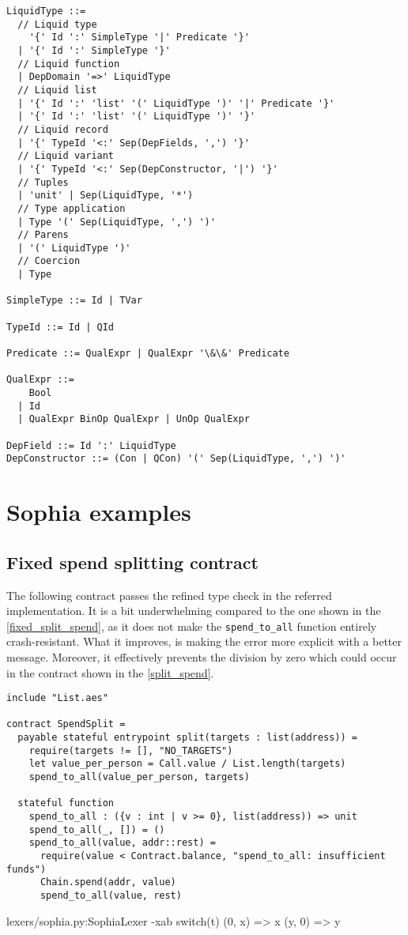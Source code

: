 \begin{lstlisting}[language=bnf]
LiquidType ::=
  // Liquid type
    '{' Id ':' SimpleType '|' Predicate '}'
  | '{' Id ':' SimpleType '}'
  // Liquid function
  | DepDomain '=>' LiquidType
  // Liquid list
  | '{' Id ':' 'list' '(' LiquidType ')' '|' Predicate '}'
  | '{' Id ':' 'list' '(' LiquidType ')' '}'
  // Liquid record
  | '{' TypeId '<:' Sep(DepFields, ',') '}'
  // Liquid variant
  | '{' TypeId '<:' Sep(DepConstructor, '|') '}'
  // Tuples
  | 'unit' | Sep(LiquidType, '*')
  // Type application
  | Type '(' Sep(LiquidType, ',') ')'
  // Parens
  | '(' LiquidType ')'
  // Coercion
  | Type

SimpleType ::= Id | TVar

TypeId ::= Id | QId

Predicate ::= QualExpr | QualExpr '\&\&' Predicate

QualExpr ::=
    Bool
  | Id
  | QualExpr BinOp QualExpr | UnOp QualExpr

DepField ::= Id ':' LiquidType
DepConstructor ::= (Con | QCon) '(' Sep(LiquidType, ',') ')'
\end{lstlisting}

\chapter{Sophia examples}

\section{Fixed spend splitting contract}
\label{fixed_spend_split}

The following contract passes the refined type check in the referred
implementation. It is a bit underwhelming compared to the one shown in the
\autoref{fixed_split_spend}, as it does not make the \texttt{spend\_to\_all}
function entirely crash-resistant. What it improves, is making the error more
explicit with a better message. Moreover, it effectively prevents the division
by zero which could occur in the contract shown in the \autoref{split_spend}.

\begin{lstlisting}[language=sophia]
include "List.aes"

contract SpendSplit =
  payable stateful entrypoint split(targets : list(address)) =
    require(targets != [], "NO_TARGETS")
    let value_per_person = Call.value / List.length(targets)
    spend_to_all(value_per_person, targets)

  stateful function
    spend_to_all : ({v : int | v >= 0}, list(address)) => unit
    spend_to_all(_, []) = ()
    spend_to_all(value, addr::rest) =
      require(value < Contract.balance, "spend_to_all: insufficient funds")
      Chain.spend(addr, value)
      spend_to_all(value, rest)
\end{lstlisting}


\begin{code}[H]{lexers/sophia.py:SophiaLexer -x}{a}{b}
switch(t)
  (0, x) => x
  (y, 0) => y
\end{code}

